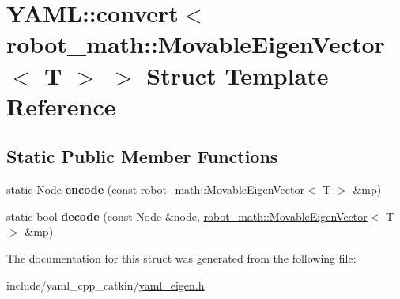 \hypertarget{structYAML_1_1convert_3_01robot__math_1_1MovableEigenVector_3_01T_01_4_01_4}{}\section{Y\+A\+ML\+:\+:convert$<$ robot\+\_\+math\+:\+:Movable\+Eigen\+Vector$<$ T $>$ $>$ Struct Template Reference}
\label{structYAML_1_1convert_3_01robot__math_1_1MovableEigenVector_3_01T_01_4_01_4}
\subsection*{Static Public Member Functions}
\begin{DoxyCompactItemize}
\item 
static Node {\bfseries encode} (const \hyperlink{structrobot__math_1_1MovableEigenVector}{robot\+\_\+math\+::\+Movable\+Eigen\+Vector}$<$ T $>$ \&mp)\hypertarget{structYAML_1_1convert_3_01robot__math_1_1MovableEigenVector_3_01T_01_4_01_4_a1eaba2e3451344a859914e8a781d542e}{}\label{structYAML_1_1convert_3_01robot__math_1_1MovableEigenVector_3_01T_01_4_01_4_a1eaba2e3451344a859914e8a781d542e}

\item 
static bool {\bfseries decode} (const Node \&node, \hyperlink{structrobot__math_1_1MovableEigenVector}{robot\+\_\+math\+::\+Movable\+Eigen\+Vector}$<$ T $>$ \&mp)\hypertarget{structYAML_1_1convert_3_01robot__math_1_1MovableEigenVector_3_01T_01_4_01_4_a31a0b4061fd234b46a046cb9f87994f2}{}\label{structYAML_1_1convert_3_01robot__math_1_1MovableEigenVector_3_01T_01_4_01_4_a31a0b4061fd234b46a046cb9f87994f2}

\end{DoxyCompactItemize}


The documentation for this struct was generated from the following file\+:\begin{DoxyCompactItemize}
\item 
include/yaml\+\_\+cpp\+\_\+catkin/\hyperlink{yaml__eigen_8h}{yaml\+\_\+eigen.\+h}\end{DoxyCompactItemize}
